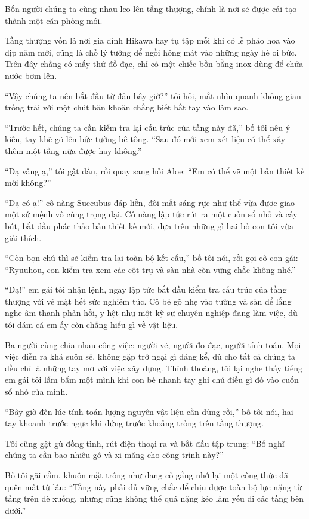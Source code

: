 \documentclass[../main.tex]{subfiles}
\begin{document}
Bốn người chúng ta cùng nhau leo lên tầng thượng, chính là nơi sẽ được cải tạo thành một căn phòng mới.

Tầng thượng vốn là nơi gia đình Hikawa hay tụ tập mỗi khi có lễ pháo hoa vào dịp năm mới, cũng là chỗ lý tưởng để ngồi hóng mát vào những ngày hè oi bức. Trên đây chẳng có mấy thứ đồ đạc, chỉ có một chiếc bồn bằng inox dùng để chứa nước bơm lên.

``Vậy chúng ta nên bắt đầu từ đâu bây giờ?'' tôi hỏi, mắt nhìn quanh không gian trống trải với một chút băn khoăn chẳng biết bắt tay vào làm sao.

``Trước hết, chúng ta cần kiểm tra lại cấu trúc của tầng này đã,'' bố tôi nêu ý kiến, tay khẽ gõ lên bức tường bê tông. ``Sau đó mới xem xét liệu có thể xây thêm một tầng nữa được hay không.''

``Dạ vâng ạ,'' tôi gật đầu, rồi quay sang hỏi Aloe: ``Em có thể vẽ một bản thiết kế mới không?''

``Dạ có ạ!'' cô nàng Succubus đáp liền, đôi mắt sáng rực như thể vừa được giao một sứ mệnh vô cùng trọng đại. Cô nàng lập tức rút ra một cuốn sổ nhỏ và cây bút, bắt đầu phác thảo bản thiết kế mới, dựa trên những gì hai bố con tôi vừa giải thích.

``Còn bọn chú thì sẽ kiểm tra lại toàn bộ kết cấu,'' bố tôi nói, rồi gọi cô con gái: ``Ryuuhou, con kiểm tra xem các cột trụ và sàn nhà còn vững chắc không nhé.''

``Dạ!'' em gái tôi nhận lệnh, ngay lập tức bắt đầu kiểm tra cấu trúc của tầng thượng với vẻ mặt hết sức nghiêm túc. Cô bé gõ nhẹ vào tường và sàn để lắng nghe âm thanh phản hồi, y hệt như một kỹ sư chuyên nghiệp đang làm việc, dù tôi dám cá em ấy còn chẳng hiểu gì về vật liệu.

Ba người cùng chia nhau công việc: người vẽ, người đo đạc, người tính toán. Mọi việc diễn ra khá suôn sẻ, không gặp trở ngại gì đáng kể, dù cho tất cả chúng ta đều chỉ là những tay mơ với việc xây dựng. Thỉnh thoảng, tôi lại nghe thấy tiếng em gái tôi lẩm bẩm một mình khi con bé nhanh tay ghi chú điều gì đó vào cuốn sổ nhỏ của mình.

``Bây giờ đến lúc tính toán lượng nguyên vật liệu cần dùng rồi,'' bố tôi nói, hai tay khoanh trước ngực khi đứng trước khoảng trống trên tầng thượng.

Tôi cũng gật gù đồng tình, rút điện thoại ra và bắt đầu tập trung: ``Bố nghĩ chúng ta cần bao nhiêu gỗ và xi măng cho công trình này?''

Bố tôi gãi cằm, khuôn mặt trông như đang cố gắng nhớ lại một công thức đã quên mất từ lâu: ``Tầng này phải đủ vững chắc để chịu được toàn bộ lực nặng từ tầng trên đè xuống, nhưng cũng không thể quá nặng kẻo làm yếu đi các tầng bên dưới.''
\end{document}
